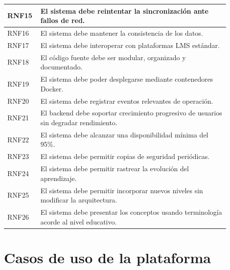 \begin{longtable}{|p{0.1\linewidth}|p{0.8\linewidth}|}
	\hline
	RNF15       & El sistema debe reintentar la sincronización ante fallos de red.                                                          \\
	\hline
	RNF16       & El sistema debe mantener la consistencia de los datos.                                                                    \\
	\hline
	RNF17       & El sistema debe interoperar con plataformas LMS estándar.                                                                 \\
	\hline
	RNF18       & El código fuente debe ser modular, organizado y documentado.                                                              \\
	\hline
	RNF19       & El sistema debe poder desplegarse mediante contenedores Docker.                                                           \\
	\hline
	RNF20       & El sistema debe registrar eventos relevantes de operación.                                                                \\
	\hline
	RNF21       & El backend debe soportar crecimiento progresivo de usuarios sin degradar rendimiento.                                     \\
	\hline
	RNF22       & El sistema debe alcanzar una disponibilidad mínima del 95\%.                                                              \\
	\hline
	RNF23       & El sistema debe permitir copias de seguridad periódicas.                                                                  \\
	\hline
	RNF24       & El sistema debe permitir rastrear la evolución del aprendizaje.                                                           \\
	\hline
	RNF25       & El sistema debe permitir incorporar nuevos niveles sin modificar la arquitectura.                                         \\
	\hline
	RNF26       & El sistema debe presentar los conceptos usando terminología acorde al nivel educativo.                                    \\
	\hline
\end{longtable}


\section{Casos de uso de la plataforma}

